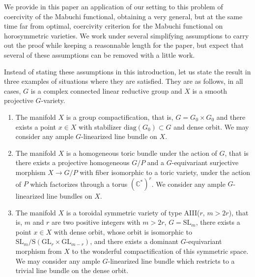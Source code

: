 \documentclass{amsart}
\theoremstyle{definition}
\begin{document}
We provide in this paper an application of our setting to this problem 
of coercivity of the Mabuchi functional, obtaining a very general, 
but at the same time far from optimal, coercivity criterion for the 
Mabuchi functional on horosymmetric varieties. 
We work under several simplifying assumptions to carry out the proof 
while keeping a reasonnable length for the paper, but expect that 
several of these assumptions can be removed with a little work. 

Instead of stating these assumptions in this introduction, let us 
state the result in three examples of situations where they are satisfied.  
They are as follows, in all cases, $G$ is a complex connected linear 
reductive group and $X$ is a smooth projective $G$-variety.
\begin{enumerate}
\item The manifold $X$ is a group compactification, that is, $G=G_0\times G_0$ 
and there exists a point $x\in X$ with stabilizer $\mathrm{diag}(G_0)\subset G$ 
and dense orbit. We may consider any ample $G$-linearized line bundle on $X$. 
\item The manifold $X$ is a homogeneous toric bundle under the action of $G$, 
that is there exists 
a projective homogeneous $G/P$ and a $G$-equivariant surjective morphism 
$X\rightarrow G/P$ with fiber isomorphic to a toric variety, under the action 
of $P$ which factorizes through a torus $(\mathbb{C}^*)^r$. 
We consider any ample $G$-linearized 
line bundles on $X$.
\item The manifold $X$ is a toroidal symmetric variety of type AIII($r$, $m>2r$), that 
is, $m$ and $r$ are two positive integers with $m>2r$, $G=\mathrm{SL}_m$, 
there exists a point $x\in X$ with dense orbit, whose orbit is isomorphic 
to $\mathrm{SL}_m/\mathrm{S}(\mathrm{GL}_r\times \mathrm{GL}_{m-r})$, and 
there exists a dominant $G$-equivariant morphism from $X$ to the wonderful 
compactification of this symmetric space. We may consider any ample 
$G$-linearized line bundle 
which restricts to a trivial line bundle on the dense orbit. 
\end{enumerate}
\end{document}
